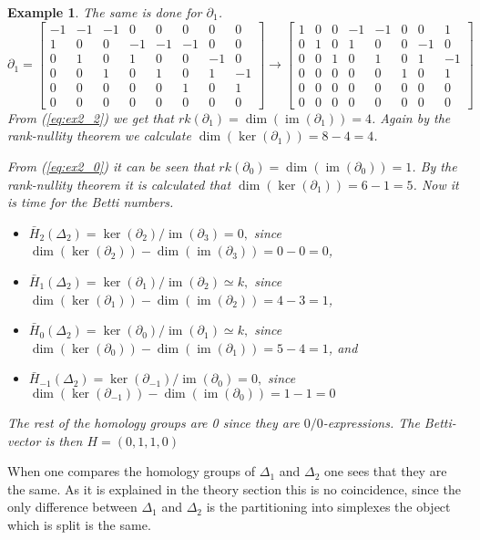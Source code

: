 \documentclass[11pt,a4paper,twoside]{report}
\newtheorem{myex}[mythm]{Example}
\DeclareMathOperator{\im}{im}
\begin{document}
\begin{myex}
The same is done for $\partial_1$.
\begin{equation}\label{eq:ex2_2}
\partial_1=
\begin{bmatrix}
-1 & -1 & -1 & 0 & 0 & 0 & 0 & 0 \\
1 & 0 & 0 & -1 & -1 & -1 & 0 & 0 \\
0 & 1 & 0 & 1 & 0 & 0 & -1 & 0 \\
0 & 0 & 1 & 0 & 1 & 0 & 1 & -1 \\
0 & 0 & 0 & 0 & 0 & 1 & 0 & 1 \\
0 & 0 & 0 & 0 & 0 & 0 & 0 & 0 
\end{bmatrix}
\to
\begin{bmatrix}
1 & 0 & 0 & -1 & -1 & 0 & 0 & 1 \\
0 & 1 & 0 & 1 & 0 & 0 & -1 & 0 \\
0 & 0 & 1 & 0 & 1 & 0 & 1 & -1 \\
0 & 0 & 0 & 0 & 0 & 1 & 0 & 1 \\
0 & 0 & 0 & 0 & 0 & 0 & 0 & 0 \\
0 & 0 & 0 & 0 & 0 & 0 & 0 & 0 
\end{bmatrix}
\end{equation}
From (\ref{eq:ex2_2}) we get that $rk(\partial_1)=\dim(\im(\partial_1))=4$. Again by the rank-nullity theorem we calculate $\dim(\ker(\partial_1))=8-4=4$.

From (\ref{eq:ex2_0}) it can be seen that $rk(\partial_0)=\dim(\im(\partial_0))=1$. By the rank-nullity theorem it is calculated that $\dim(\ker(\partial_1))=6-1=5$. Now it is time for the Betti numbers.
\begin{itemize}
\item $\bar{H}_2(\Delta_2)=\ker(\partial_2)/\im(\partial_{3})=0,$
since $\dim(\ker(\partial_2))-\dim(\im(\partial_{3}))=0-0=0$,
\item$\bar{H}_1(\Delta_2)=\ker(\partial_1)/\im(\partial_{2})\simeq k,$ since $\dim(\ker(\partial_1))-\dim(\im(\partial_{2}))=4-3=1$,
\item$\bar{H}_0(\Delta_2)=\ker(\partial_0)/\im(\partial_{1})\simeq k,$
since $\dim(\ker(\partial_0))-\dim(\im(\partial_{1}))=5-4=1$, and 
\item$\bar{H}_{-1}(\Delta_2)=\ker(\partial_{-1})/\im(\partial_{0})=0,$
since $\dim(\ker(\partial_{-1}))-\dim(\im(\partial_{0}))=1-1=0$
\end{itemize}
The rest of the homology groups are 0 since they are $0/0$-expressions.
The Betti-vector is then $H=(0,1,1,0)$
\end{myex}
When one compares the homology groups of $\Delta_1$ and $\Delta_2$ one sees that they are the same. As it is explained in the theory section this is no coincidence, since the only difference between $\Delta_1$ and $\Delta_2$ is the partitioning into simplexes the object which is split is the same.
\end{document}
